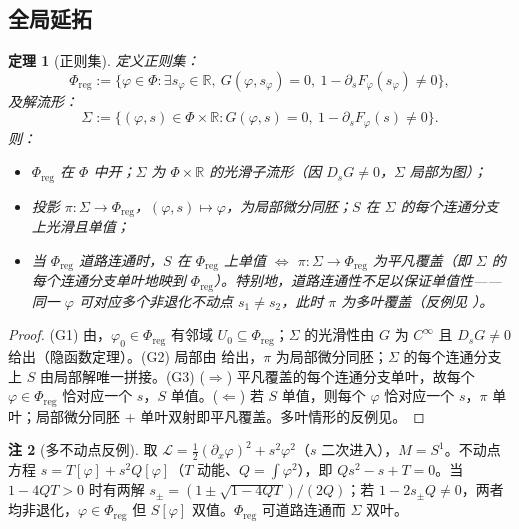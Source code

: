 \documentclass[12pt,a4paper]{article}
\newtheorem{theorem}{定理}[section]
\theoremstyle{definition}
\newtheorem{remark}[theorem]{注}
\newcommand{\mL}{\mathcal{L}}
\newcommand{\mPhi}{\Phi}
\newcommand{\mreg}{\mPhi_{\mathrm{reg}}}
\newcommand{\R}{\mathbb{R}}
\begin{document}
\subsection{全局延拓}

\begin{theorem}[正则集]
\label{thm:reg-set}
定义\emph{正则集}：
\[ \mreg := \{\varphi \in \mPhi : \exists s_\varphi \in \R,\ G(\varphi, s_\varphi) = 0,\ 1 - \partial_s F_\varphi(s_\varphi) \neq 0\}, \]
及\emph{解流形}：
\[ \Sigma := \{(\varphi, s) \in \mPhi \times \R : G(\varphi, s) = 0,\ 1 - \partial_s F_\varphi(s) \neq 0\}. \]
则：
\begin{itemize}
\item[(G1)] $\mreg$ 在 $\mPhi$ 中开；$\Sigma$ 为 $\mPhi \times \R$ 的光滑子流形（因 $D_s G \neq 0$，$\Sigma$ 局部为图）；
\item[(G2)] 投影 $\pi: \Sigma \to \mreg$，$(\varphi, s) \mapsto \varphi$，为局部微分同胚；$S$ 在 $\Sigma$ 的每个连通分支上光滑且单值；
\item[(G3)] 当 $\mreg$ 道路连通时，$S$ 在 $\mreg$ 上单值 $\iff$ $\pi: \Sigma \to \mreg$ 为平凡覆盖（即 $\Sigma$ 的每个连通分支单叶地映到 $\mreg$）。特别地，道路连通性\emph{不}足以保证单值性——同一 $\varphi$ 可对应多个非退化不动点 $s_1 \neq s_2$，此时 $\pi$ 为多叶覆盖（反例见 ）。
\end{itemize}
\end{theorem}

\begin{proof}
(G1) 由，$\varphi_0 \in \mreg$ 有邻域 $U_0 \subseteq \mreg$；$\Sigma$ 的光滑性由 $G$ 为 $C^\infty$ 且 $D_s G \neq 0$ 给出（隐函数定理）。(G2) 局部由  给出，$\pi$ 为局部微分同胚；$\Sigma$ 的每个连通分支上 $S$ 由局部解唯一拼接。(G3) ($\Rightarrow$) 平凡覆盖的每个连通分支单叶，故每个 $\varphi \in \mreg$ 恰对应一个 $s$，$S$ 单值。($\Leftarrow$) 若 $S$ 单值，则每个 $\varphi$ 恰对应一个 $s$，$\pi$ 单叶；局部微分同胚 + 单叶双射即平凡覆盖。多叶情形的反例见。
\end{proof}

\begin{remark}[多不动点反例]
\label{rem:multi-fixed-point}
取 $\mL = \frac{1}{2}(\partial_x\varphi)^2 + s^2\varphi^2$（$s$ 二次进入），$M = S^1$。不动点方程 $s = T[\varphi] + s^2 Q[\varphi]$（$T$ 动能、$Q = \int\varphi^2$），即 $Q s^2 - s + T = 0$。当 $1 - 4QT > 0$ 时有两解 $s_\pm = (1 \pm \sqrt{1-4QT})/(2Q)$；若 $1 - 2s_\pm Q \neq 0$，两者均非退化，$\varphi \in \mreg$ 但 $S[\varphi]$ 双值。$\Phi_{\mathrm{reg}}$ 可道路连通而 $\Sigma$ 双叶。
\end{remark}
\end{document}

